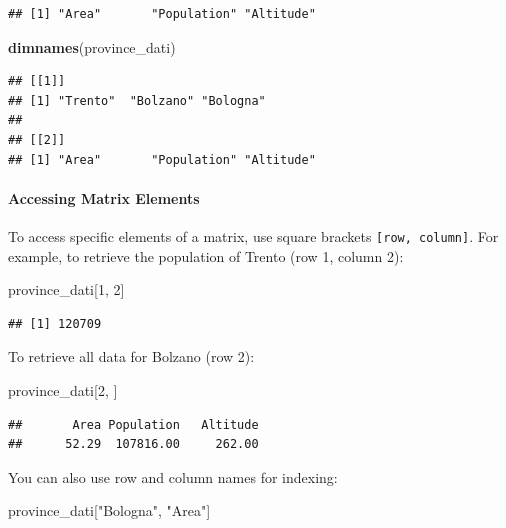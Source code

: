 \documentclass[
]{article}
\newenvironment{Shaded}{\begin{snugshade}}{\end{snugshade}}
\newcommand{\DecValTok}[1]{\textcolor[rgb]{0.00,0.00,0.81}{#1}}
\newcommand{\FunctionTok}[1]{\textcolor[rgb]{0.13,0.29,0.53}{\textbf{#1}}}
\newcommand{\NormalTok}[1]{#1}
\newcommand{\StringTok}[1]{\textcolor[rgb]{0.31,0.60,0.02}{#1}}
\begin{document}
\begin{verbatim}
## [1] "Area"       "Population" "Altitude"
\end{verbatim}

\begin{Shaded}
\begin{Highlighting}[]
\FunctionTok{dimnames}\NormalTok{(province\_dati)}
\end{Highlighting}
\end{Shaded}

\begin{verbatim}
## [[1]]
## [1] "Trento"  "Bolzano" "Bologna"
## 
## [[2]]
## [1] "Area"       "Population" "Altitude"
\end{verbatim}

\hypertarget{accessing-matrix-elements}{%
\paragraph{Accessing Matrix Elements}\label{accessing-matrix-elements}}

To access specific elements of a matrix, use square brackets
\texttt{{[}row,\ column{]}}. For example, to retrieve the population of
Trento (row 1, column 2):

\begin{Shaded}
\begin{Highlighting}[]
\NormalTok{province\_dati[}\DecValTok{1}\NormalTok{, }\DecValTok{2}\NormalTok{]}
\end{Highlighting}
\end{Shaded}

\begin{verbatim}
## [1] 120709
\end{verbatim}

To retrieve all data for Bolzano (row 2):

\begin{Shaded}
\begin{Highlighting}[]
\NormalTok{province\_dati[}\DecValTok{2}\NormalTok{, ]}
\end{Highlighting}
\end{Shaded}

\begin{verbatim}
##       Area Population   Altitude 
##      52.29  107816.00     262.00
\end{verbatim}

You can also use row and column names for indexing:

\begin{Shaded}
\begin{Highlighting}[]
\NormalTok{province\_dati[}\StringTok{"Bologna"}\NormalTok{, }\StringTok{"Area"}\NormalTok{]}
\end{Highlighting}
\end{Shaded}
\end{document}
